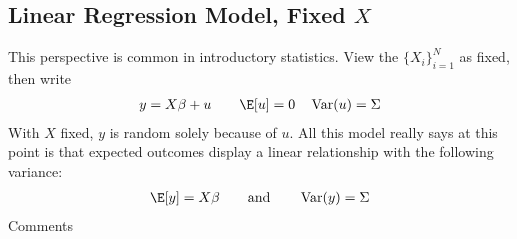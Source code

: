 \documentclass[12pt]{article}
\theoremstyle{plain}
\theoremstyle{definition}
\theoremstyle{remark}
\newcommand{\Var}{\operatorname{Var}}
\begin{document}
\clearpage
\subsection{Linear Regression Model, Fixed $X$}

This perspective is common in introductory statistics.
View the $\{X_i\}_{i=1}^N$ as fixed, then write
\begin{align}
  y = X\beta + u
  \qquad
  \E[u]=0
  \quad
  \Var(u)=\Sigma
  \label{classicalstat}
\end{align}
With $X$ fixed,
$y$ is random solely because of $u$.
All this model really says at this point is that expected outcomes
display a linear relationship with the following variance:
\begin{align*}
  \E[y]=X\beta
  \qquad\text{and}\qquad
  \Var(y)=\Sigma
\end{align*}
Comments
\end{document}
